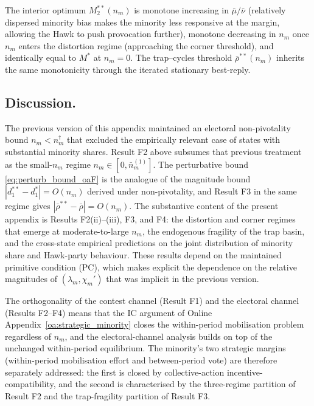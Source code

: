 \documentclass[11pt,twoside]{extarticle}
\begin{document}
The interior optimum $M_2^{**}(n_m)$ is monotone increasing in $\bar\mu/\bar\nu$ (relatively dispersed minority bias makes the minority less responsive at the margin, allowing the Hawk to push provocation further), monotone decreasing in $n_m$ once $n_m$ enters the distortion regime (approaching the corner threshold), and identically equal to $M^{*}$ at $n_m=0$. The trap--cycles threshold $\bar\rho^{**}(n_m)$ inherits the same monotonicity through the iterated stationary best-reply.

\subsection*{Discussion.} The previous version of this appendix maintained an electoral non-pivotality bound $n_m<n_m^{\dagger}$ that excluded the empirically relevant case of states with substantial minority shares. Result F2 above subsumes that previous treatment as the small-$n_m$ regime $n_m\in[0,\bar n_m^{(1)}]$. The perturbative bound \eqref{eq:perturb_bound_oaF} is the analogue of the magnitude bound $|d_1^{**}-d_1^{*}|=O(n_m)$ derived under non-pivotality, and Result F3 in the same regime gives $|\bar\rho^{**}-\bar\rho|=O(n_m)$. The substantive content of the present appendix is Results F2(ii)--(iii), F3, and F4: the distortion and corner regimes that emerge at moderate-to-large $n_m$, the endogenous fragility of the trap basin, and the cross-state empirical predictions on the joint distribution of minority share and Hawk-party behaviour. These results depend on the maintained primitive condition (PC), which makes explicit the dependence on the relative magnitudes of $(\lambda_m,\chi_m')$ that was implicit in the previous version.

The orthogonality of the contest channel (Result F1) and the electoral channel (Results F2--F4) means that the IC argument of Online Appendix~\ref{oa:strategic_minority} closes the within-period mobilisation problem regardless of $n_m$, and the electoral-channel analysis builds on top of the unchanged within-period equilibrium. The minority's two strategic margins (within-period mobilisation effort and between-period vote) are therefore separately addressed: the first is closed by collective-action incentive-compatibility, and the second is characterised by the three-regime partition of Result F2 and the trap-fragility partition of Result F3.
\end{document}
